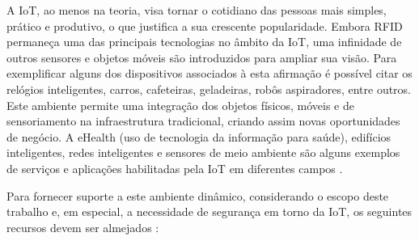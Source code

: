 \documentclass[tid,table]{texufpel} %
\begin{document}
A  IoT, ao menos na teoria, visa tornar o cotidiano das pessoas mais simples, prático e produtivo, o que justifica a sua crescente popularidade. Embora RFID permaneça uma das principais tecnologias no âmbito da IoT, uma infinidade de outros sensores e objetos móveis são introduzidos para ampliar sua visão. Para exemplificar alguns dos dispositivos associados à esta afirmação é possível citar os relógios inteligentes, carros, cafeteiras, geladeiras, robôs aspiradores, entre outros. Este ambiente permite uma integração dos objetos físicos, móveis e de sensoriamento na infraestrutura tradicional, criando assim novas oportunidades de negócio. A eHealth (uso de tecnologia da informação para saúde), edifícios inteligentes, redes inteligentes e sensores de meio ambiente são alguns exemplos de serviços e aplicações habilitadas pela IoT em diferentes campos \cite{aman16}.

Para fornecer suporte a este ambiente dinâmico, considerando o escopo deste trabalho e, em especial, a necessidade de segurança em torno da IoT, os seguintes recursos devem ser almejados \cite{miorandi12}:
\end{document}
